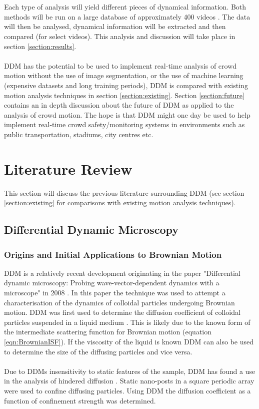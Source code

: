 \documentclass[10pt]{article}
\begin{document}
\\\\
Each type of analysis will yield different pieces of dynamical information. Both methods will be run on a large database of approximately 400 videos \cite{crowdMotionDB}. The data will then be analysed, dynamical information will be extracted and then compared (for select videos). This analysis and discussion will take place in section \ref{section:results}.
\\\\
DDM has the potential to be used to implement real-time analysis of crowd motion without the use of image segmentation, or the use of machine learning (expensive datasets and long training periods), DDM is compared with existing motion analysis techniques in section \ref{section:existing}. Section \ref{section:future} contains an in depth discussion about the future of DDM as applied to the analysis of crowd motion. The hope is that DDM might one day be used to help implement real-time crowd safety/monitoring systems in environments such as public transportation, stadiums, city centres etc.

\section{Literature Review}
This section will discuss the previous literature surrounding DDM (see section \ref{section:existing} for comparisons with existing motion analysis techniques).
\subsection{Differential Dynamic Microscopy}
\subsubsection{Origins and Initial Applications to Brownian Motion}
DDM is a relatively recent development originating in the paper "Differential dynamic microscopy: Probing wave-vector-dependent dynamics with a microscope" in 2008 \cite{ddm0}. In this paper the technique was used to attempt a characterisation of the dynamics of colloidal particles undergoing Brownian motion. DDM was first used to determine the diffusion coefficient of colloidal particles suspended in a liquid medium \cite{ddm0} \cite{ddm_maths}. This is likely due to the known form of the intermediate scattering function for Brownian motion (equation \ref{eqn:BrownianISF}). If the viscosity of the liquid is known DDM can also be used to determine the size of the diffusing particles \cite{ddm1} and vice versa. 
\\\\
Due to DDMs insensitivity to static features of the sample, DDM has found a use in the analysis of hindered diffusion \cite{nanoposts}. Static nano-posts in a square periodic array were used to confine diffusing particles. Using DDM the diffusion coefficient as a function of confinement strength was determined.
\end{document}
